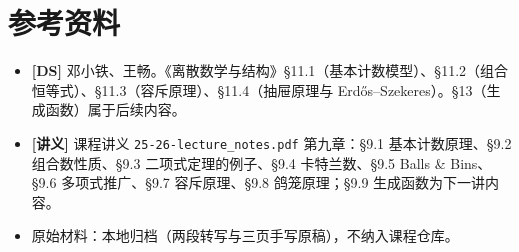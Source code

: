 \documentclass[UTF8,a4paper,11pt]{ctexart}
\begin{document}
\section*{参考资料}
\begin{itemize}
\item \textbf{[DS]} 邓小铁、王畅。《离散数学与结构》§11.1（基本计数模型）、§11.2（组合恒等式）、§11.3（容斥原理）、§11.4（抽屉原理与 Erdős--Szekeres）。§13（生成函数）属于后续内容。
\item \textbf{[讲义]} 课程讲义 \texttt{25-26-lecture\_notes.pdf} 第九章：§9.1 基本计数原理、§9.2 组合数性质、§9.3 二项式定理的例子、§9.4 卡特兰数、§9.5 Balls \& Bins、§9.6 多项式推广、§9.7 容斥原理、§9.8 鸽笼原理；§9.9 生成函数为下一讲内容。
\item 原始材料：本地归档（两段转写与三页手写原稿），不纳入课程仓库。
\end{itemize}
\end{document}
